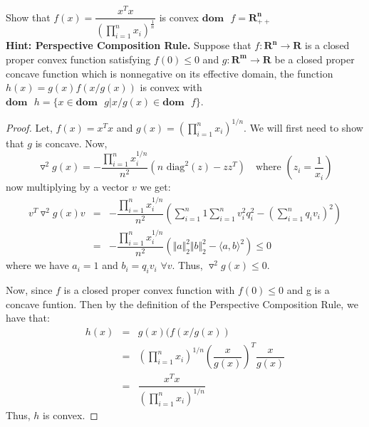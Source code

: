 \begin{prob}[2.3]
  Show that $f(x) = \dfrac{x^{T}x}{(\prod^{n}_{i=1} x_{i})^{\frac{1}{n}}}$ is convex $\mathbf{dom} \mbox{ }f = \mathbf{R^{n}_{++}}$\\
\textbf{Hint: Perspective Composition Rule.} Suppose that $f: \mathbf{R^{n}} \rightarrow \mathbf{R}$ is a closed proper convex function satisfying $f(0) \leq 0$ and $g: \mathbf{R^{m}} \rightarrow \mathbf{R}$ be a closed proper concave function which is nonnegative on its effective domain, the function $h(x) = g(x) f(x/g(x))$ is convex with $\mathbf{dom} \mbox{ }h = \{ x \in \mathbf{dom} \mbox{ }g \vert x/g(x) \in \mathbf{dom} \mbox{ }f\}$.
\end{prob}
\begin{proof}
  Let, $f(x) = x^{T}x$ and $g(x) = (\prod_{i=1}^{n} x_{i})^{1/n}$. We will first need to show that $g$ is concave. Now,
  \[
    \triangledown^{2} g(x) = -\dfrac{\prod_{i=1}^{n} x_{i}^{1/n}}{n^{2}}(n \mbox{ diag}^{2}(z) - zz^{T})\quad \mbox{where }(z_{i} = \dfrac{1}{x_{i}})
  \]
  now multiplying by a vector $v$ we get:
  \begin{eqnarray*}
    v^{T}\triangledown^{2} g(x)v &=& -\dfrac{\prod_{i=1}^{n} x_{i}^{1/n}}{n^{2}}\left(\sum_{i=1}^{n}1\sum_{i=1}^{n}v_{i}^{2}q_{i}^{2} - \left(\sum_{i=1}^{n}q_{i}v_{i}\right)^{2}\right)\\
    & = & -\dfrac{\prod_{i=1}^{n} x_{i}^{1/n}}{n^{2}}(\Vert a \Vert_{2}^{2}\Vert b \Vert_{2}^{2} - \langle a,b\rangle^{2}) \leq 0
  \end{eqnarray*}
  where we have $a_{i} = 1$ and $b_{i} = q_{i}v_{i}$ $\forall v$.  Thus, $\triangledown^{2} g(x) \leq 0$.

  Now, since $f$ is a closed proper convex function with $f(0) \leq 0$ and g is a concave funtion. Then by the definition of the Perspective Composition Rule, we have that:
  \begin{eqnarray*}
    h(x) &=& g(x)(f(x/g(x))\\
    &=& (\prod_{i=1}^{n} x_{i})^{1/n}\left(\dfrac{x}{g(x)}\right)^{T}\dfrac{x}{g(x)}\\
    &=& \dfrac{x^{T}x}{(\prod_{i=1}^{n} x_{i})^{1/n}}
  \end{eqnarray*}
  Thus, $h$ is convex.
  
\end{proof}
